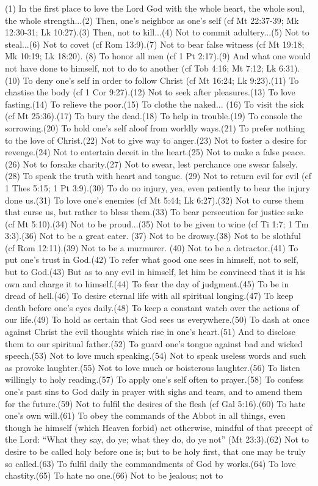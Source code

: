 
(1) In the first place to love the Lord God with the whole heart, the whole soul, the whole strength...(2) Then, one's neighbor as one's self (cf Mt 22:37-39; Mk 12:30-31; Lk 10:27).(3) Then, not to kill...(4) Not to commit adultery...(5) Not to steal...(6) Not to covet (cf Rom 13:9).(7) Not to bear false witness (cf Mt 19:18; Mk 10:19; Lk 18:20). (8) To honor all men (cf 1 Pt 2:17).(9) And what one would not have done to himself, not to do to another (cf Tob 4:16; Mt 7:12; Lk 6:31).(10) To deny one's self in order to follow Christ (cf Mt 16:24; Lk 9:23).(11) To chastise the body (cf 1 Cor 9:27).(12) Not to seek after pleasures.(13) To love fasting.(14) To relieve the poor.(15) To clothe the naked... (16) To visit the sick (cf Mt 25:36).(17) To bury the dead.(18) To help in trouble.(19) To console the sorrowing.(20) To hold one's self aloof from worldly ways.(21) To prefer nothing to the love of Christ.(22) Not to give way to anger.(23) Not to foster a desire for revenge.(24) Not to entertain deceit in the heart.(25) Not to make a false peace.(26) Not to forsake charity.(27) Not to swear, lest perchance one swear falsely.(28) To speak the truth with heart and tongue. (29) Not to return evil for evil (cf 1 Thes 5:15; 1 Pt 3:9).(30) To do no injury, yea, even patiently to bear the injury done us.(31) To love one's enemies (cf Mt 5:44; Lk 6:27).(32) Not to curse them that curse us, but rather to bless them.(33) To bear persecution for justice sake (cf Mt 5:10).(34) Not to be proud...(35) Not to be given to wine (cf Ti 1:7; 1 Tm 3:3).(36) Not to be a great eater. (37) Not to be drowsy.(38) Not to be slothful (cf Rom 12:11).(39) Not to be a murmurer. (40) Not to be a detractor.(41) To put one's trust in God.(42) To refer what good one sees in himself, not to self, but to God.(43) But as to any evil in himself, let him be convinced that it is his own and charge it to himself.(44) To fear the day of judgment.(45) To be in dread of hell.(46) To desire eternal life with all spiritual longing.(47) To keep death before one's eyes daily.(48) To keep a constant watch over the actions of our life.(49) To hold as certain that God sees us everywhere.(50) To dash at once against Christ the evil thoughts which rise in one's heart.(51) And to disclose them to our spiritual father.(52) To guard one's tongue against bad and wicked speech.(53) Not to love much speaking.(54) Not to speak useless words and such as provoke laughter.(55) Not to love much or boisterous laughter.(56) To listen willingly to holy reading.(57) To apply one's self often to prayer.(58) To confess one's past sins to God daily in prayer with sighs and tears, and to amend them for the future.(59) Not to fulfil the desires of the flesh (cf Gal 5:16).(60) To hate one's own will.(61) To obey the commands of the Abbot in all things, even though he himself (which Heaven forbid) act otherwise, mindful of that precept of the Lord: ``What they say, do ye; what they do, do ye not'' (Mt 23:3).(62) Not to desire to be called holy before one is; but to be holy first, that one may be truly so called.(63) To fulfil daily the commandments of God by works.(64) To love chastity.(65) To hate no one.(66) Not to be jealous; not to 